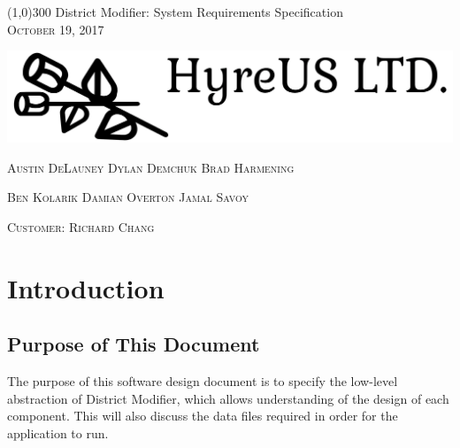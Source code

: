 \documentclass{article}
\begin{document}
\begin{titlepage}

	\begin{center}
 	\line(1,0){300} 
 	\huge{ District Modifier: System Requirements Specification} \\
 	
 	\vspace{1mm} 
 	\textsc{\normalsize October 19, 2017}
 	
 	\vspace{10mm}
	
	\hspace*{-2cm}   
	\includegraphics[scale=.25]{Logo.png}

	\vspace{10mm}
 
 	\textsc{\normalsize Austin DeLauney \quad Dylan Demchuk \quad Brad Harmening}
 	
 	\vspace{2mm}
 	
 	\textsc{\normalsize Ben Kolarik \quad Damian Overton \quad Jamal Savoy}
 
 	\vspace{2mm}
 	
 	\textsc{\normalsize Customer: Richard Chang}
 
 
 	\thispagestyle{empty}
 	
 \end{center}
 \end{titlepage}

\section{Introduction}\label{sec:intro}

\subsection{Purpose of This Document}

\vspace{2.5mm}

\begin{addmargin}[4em]{0em}
The purpose of this software design document is to specify the low-level abstraction of District Modifier, which allows understanding of the design of each component. This will also discuss the data files required in order for the application to run. 
\end{addmargin}
\end{document}
